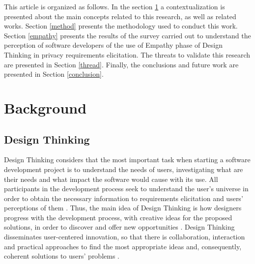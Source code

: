 \documentclass[conference]{IEEEtran}
\begin{document}
This article is organized as follows. In the section \ref{back} a contextualization is presented about the main concepts related to this research, as well as related works. Section \ref{method} presents the methodology used to conduct this work. Section \ref{empathy} presents the results of the survey carried out to understand the perception of software developers of the use of Empathy phase of Design Thinking in privacy requirements elicitation. The threats to validate this research are presented in Section \ref{thread}. Finally, the conclusions and future work are presented in Section \ref{conclusion}.

\section{Background}
\label{back}
\subsection{Design Thinking}


Design Thinking considers that the most important task when starting a software development project is to understand the needs of users, investigating what are their needs and what impact the software would cause with its use. All participants in the development process seek to understand the user's universe in order to obtain the necessary information to requirements elicitation and users' perceptions of them \cite{DBLP:books/lib/brown2009change}. Thus, the main idea of Design Thinking is how designers progress with the development process, with creative ideas for the proposed solutions, in order to discover and offer new opportunities \cite{DBLP:conf/hci/AdikariMC13}. Design Thinking disseminates user-centered innovation, so that there is collaboration, interaction and practical approaches to find the most appropriate ideas and, consequently, coherent solutions to users' problems \cite{DBLP:books/lib/brown2009change}.
\end{document}

